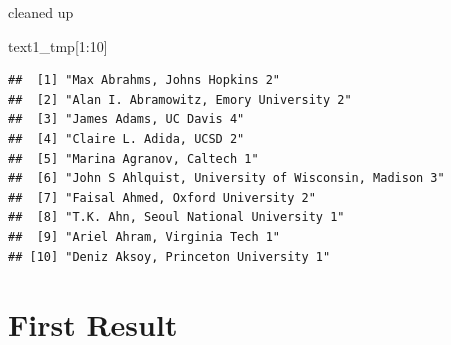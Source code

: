 \documentclass[ignorenonframetext,]{beamer}
\newenvironment{Shaded}{\begin{snugshade}}{\end{snugshade}}
\newcommand{\DecValTok}[1]{\textcolor[rgb]{0.00,0.00,0.81}{{#1}}}
\newcommand{\NormalTok}[1]{{#1}}
\begin{document}
\begin{frame}[fragile]{cleaned up}

\begin{Shaded}
\begin{Highlighting}[]
\NormalTok{text1_tmp[}\DecValTok{1}\NormalTok{:}\DecValTok{10}\NormalTok{]}
\end{Highlighting}
\end{Shaded}

\begin{verbatim}
##  [1] "Max Abrahms, Johns Hopkins 2"                       
##  [2] "Alan I. Abramowitz, Emory University 2"             
##  [3] "James Adams, UC Davis 4"                            
##  [4] "Claire L. Adida, UCSD 2"                            
##  [5] "Marina Agranov, Caltech 1"                          
##  [6] "John S Ahlquist, University of Wisconsin, Madison 3"
##  [7] "Faisal Ahmed, Oxford University 2"                  
##  [8] "T.K. Ahn, Seoul National University 1"              
##  [9] "Ariel Ahram, Virginia Tech 1"                       
## [10] "Deniz Aksoy, Princeton University 1"
\end{verbatim}

\end{frame}

\section{First Result}\label{first-result}
\end{document}
